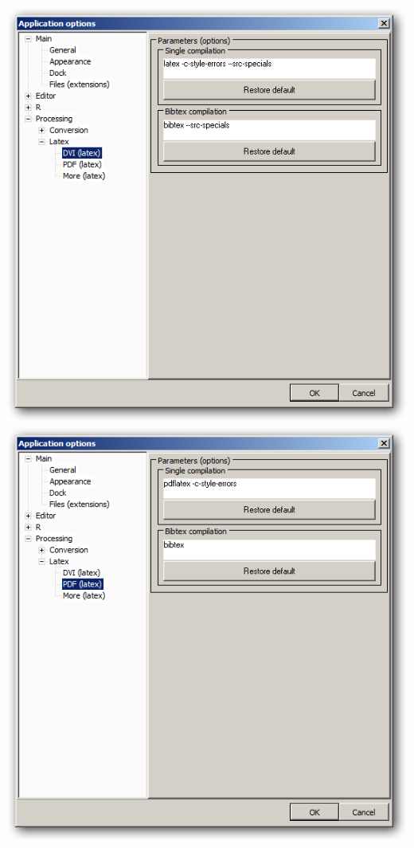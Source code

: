 \includegraphics[scale=0.50]{./res/app_processing_latex_dvi.png}
\includegraphics[scale=0.50]{./res/app_processing_latex_pdf.png}

